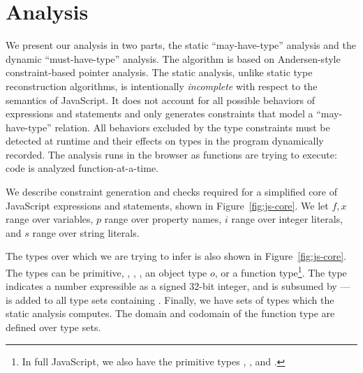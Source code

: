 \section{Analysis}

We present our analysis in two parts, the static ``may-have-type'' analysis
and the dynamic ``must-have-type'' analysis. The algorithm is based on
Andersen-style constraint-based pointer analysis. The static analysis, unlike
static type reconstruction algorithms, is intentionally \textit{incomplete}
with respect to the semantics of JavaScript. It does not account for all
possible behaviors of expressions and statements and only generates
constraints that model a ``may-have-type'' relation. All behaviors excluded by
the type constraints must be detected at runtime and their effects on types in
the program dynamically recorded. The analysis runs in the browser as functions
are trying to execute: code is analyzed function-at-a-time.

%
%
%
%
%
%

We describe constraint generation and checks required for a simplified core of
JavaScript expressions and statements, shown in Figure~\ref{fig:js-core}. We
let $f,x$ range over variables, $p$ range over property names, $i$ range over
integer literals, and $s$ range over string literals.

The types over which we are trying to infer is also shown in
Figure~\ref{fig:js-core}. The types can be primitive, ,
, , an object type $o$, or a function
type\footnote{In full JavaScript, we also have the primitive types
  , , and .}. The  type
indicates a number expressible as a signed 32-bit integer, and is subsumed by
 ---  is added to all type sets containing
. Finally, we have sets of types which the static analysis
computes. The domain and codomain of the function type are defined over type
sets.

